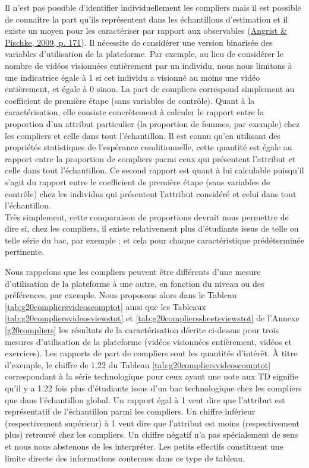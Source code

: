 \documentclass[
]{book}
\begin{document}
Il n'est pas possible d'identifier individuellement les compliers mais il est possible de connaître la part qu'ils représentent dans les échantillons d'estimation et il existe un moyen pour les caractériser par rapport aux observables (\protect\hyperlink{ref-ANG:PIS:08}{Angrist \& Pischke, 2009, p. 171}). Il nécessite de considérer une version binarisée des variables d'utilisation de la plateforme. Par exemple, au lieu de considérer le nombre de vidéos visionnées entièrement par un individu, nous nous limitons à une indicatrice égale à 1 si cet individu a visionné au moins une vidéo entièrement, et égale à 0 sinon. La part de compliers correspond simplement au coefficient de première étape (sans variables de contrôle). Quant à la caractérisation, elle consiste concrètement à calculer le rapport entre la proportion d'un attribut particulier (la proportion de femmes, par exemple) chez les compliers et celle dans tout l'échantillon. Il est connu qu'en utilisant des propriétés statistiques de l'espérance conditionnelle, cette quantité est égale au rapport entre la proportion de compliers parmi ceux qui présentent l'attribut et celle dans tout l'échantillon. Ce second rapport est quant à lui calculable puisqu'il s'agit du rapport entre le coefficient de première étape (sans variables de contrôle) chez les individus qui présentent l'attribut considéré et celui dans tout l'échantillon.\\
Très simplement, cette comparaison de proportions devrait nous permettre de dire si, chez les compliers, il existe relativement plus d'étudiants issus de telle ou telle série du bac, par exemple ; et cela pour chaque caractéristique prédéterminée pertinente.

Nous rappelons que les compliers peuvent être différents d'une mesure d'utilisation de la plateforme à une autre, en fonction du niveau ou des préférences, par exemple. Nous proposons alors dans le Tableau \ref{tab:g20compliersvideoscomptot} ainsi que les Tableaux \ref{tab:g20compliersvideosviewstot} et \ref{tab:g20complierssheetsviewstot} de l'Annexe \ref{g20compliers} les résultats de la caractérisation décrite ci-dessus pour trois mesures d'utilisation de la plateforme (vidéos visionnées entièrement, vidéos et exercices). Les rapports de part de compliers sont les quantités d'intérêt. À titre d'exemple, le chiffre de 1.22 du Tableau \ref{tab:g20compliersvideoscomptot} correspondant à la série technologique pour ceux ayant une note aux TD signifie qu'il y a 1.22 fois plus d'étudiants issus d'un bac technologique chez les compliers que dans l'échantillon global. Un rapport égal à 1 veut dire que l'attribut est représentatif de l'échantillon parmi les compliers. Un chiffre inférieur (respectivement supérieur) à 1 veut dire que l'attribut est moins (respectivement plus) retrouvé chez les compliers. Un chiffre négatif n'a pas spécialement de sens et nous nous abstenons de les interpréter. Les petits effectifs constituent une limite directe des informations contenues dans ce type de tableau.
\end{document}
